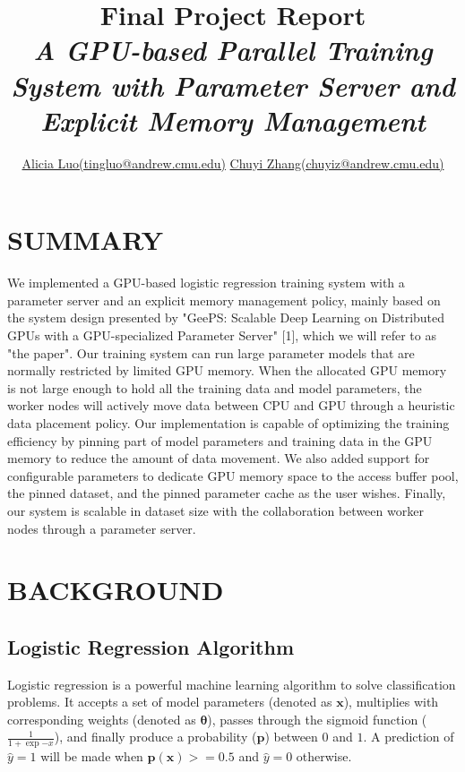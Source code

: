 \documentclass{article}
\title{Final Project Report\\
        \Large \emph{A GPU-based Parallel Training System with Parameter Server and Explicit Memory Management}}
\author{\href{mailto:tingluo@andrew.cmu.edu}{Alicia Luo(tingluo@andrew.cmu.edu)} \href{mailto:tingluo@andrew.cmu.edu}{Chuyi Zhang(chuyiz@andrew.cmu.edu)}}
\date{\vspace{-5ex}} %
\newcommand{\pv}{\mathbf{p}}
\newcommand{\xv}{\mathbf{x}}
\newcommand{\thetav     }{\boldsymbol \theta     }
\begin{document}
\maketitle
\thispagestyle{firstpage}
\section*{SUMMARY}

We implemented a GPU-based logistic regression training system with a parameter server and an explicit memory management policy, mainly based on the system design presented by "GeePS: Scalable Deep Learning on Distributed GPUs with a GPU-specialized Parameter Server" [1], which we will refer to as "the paper". Our training system can run large parameter models that are normally restricted by limited GPU memory. When the allocated GPU memory is not large enough to hold all the training data and model parameters, the worker nodes will actively move data between CPU and GPU through a heuristic data placement policy. Our implementation is capable of optimizing the training efficiency by pinning part of model parameters and training data in the GPU memory to reduce the amount of data movement. We also added support for configurable parameters to dedicate GPU memory space to the access buffer pool, the pinned dataset, and the pinned parameter cache as the user wishes. Finally, our system is scalable in dataset size with the collaboration between worker nodes through a parameter server.

\section*{BACKGROUND}
\subsection*{Logistic Regression Algorithm}
Logistic regression is a powerful machine learning algorithm to solve classification problems. It accepts a set of model parameters (denoted as $\xv$), multiplies with corresponding weights (denoted as $\thetav$), passes through the sigmoid function ($\frac{1}{1+\exp{-x}}$), and finally produce a probability ($\pv$) between $0$ and $1$. A prediction of $\hat{y} = 1$ will be made when $\pv(\xv) >= 0.5$ and $\hat{y} = 0$ otherwise.
\end{document}
